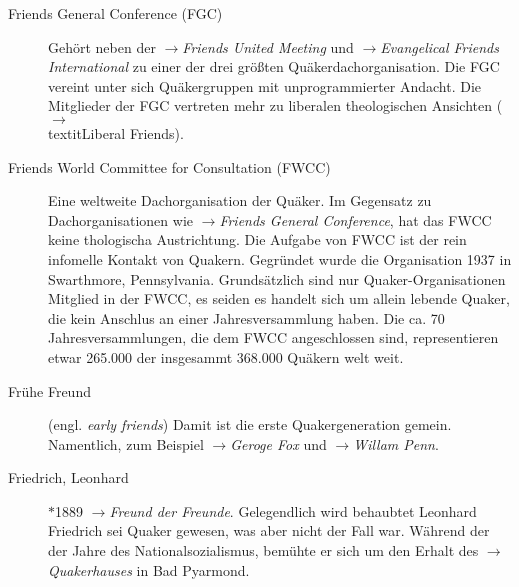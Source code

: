 \begin{description}
 \item[Friends General Conference (FGC)] Gehört neben der
 $\to$\textit{Friends United Meeting} und $\to$\textit{Evangelical Friends
 International} zu einer der drei größten Quäkerdachorganisation. Die FGC
 vereint unter sich Quäkergruppen mit unprogrammierter Andacht. Die Mitglieder
 der FGC vertreten mehr zu liberalen theologischen Ansichten
 ($\to$\\textit{Liberal Friends}). 



 \item[Friends World Committee for Consultation (FWCC)] Eine weltweite
 Dachorganisation der Quäker. Im Gegensatz zu Dachorganisationen wie
 $\to$\textit{Friends General Conference}, hat das FWCC keine thologischa
 Austrichtung. Die Aufgabe von FWCC ist der rein infomelle Kontakt von Quakern.
 Gegründet wurde die Organisation 1937 in Swarthmore, Pennsylvania.
 Grundsätzlich sind nur Quaker-Organisationen Mitglied in der FWCC, es seiden
 es handelt sich um allein lebende Quaker, die kein Anschlus an einer
 Jahresversammlung haben. Die ca. 70 Jahresversammlungen, die dem FWCC
 angeschlossen sind, representieren etwar 265.000 der insgesammt 368.000
 Quäkern welt weit.



 \item[Frühe Freund] (engl. \textit{early friends}) Damit ist die erste
 Quakergeneration gemein. Namentlich, zum Beispiel $\to$\textit{Geroge Fox}
 und $\to$\textit{Willam Penn}.

  \item[Friedrich, Leonhard] $\ast$1889  $\to$\textit{Freund der
  Freunde}. Gelegendlich
  wird behaubtet Leonhard Friedrich sei Quaker gewesen, was aber nicht der
  Fall war. Während der der Jahre des Nationalsozialismus, bemühte er sich
  um den Erhalt des $\to$\textit{Quakerhauses} in Bad Pyarmond.


\end{description}
